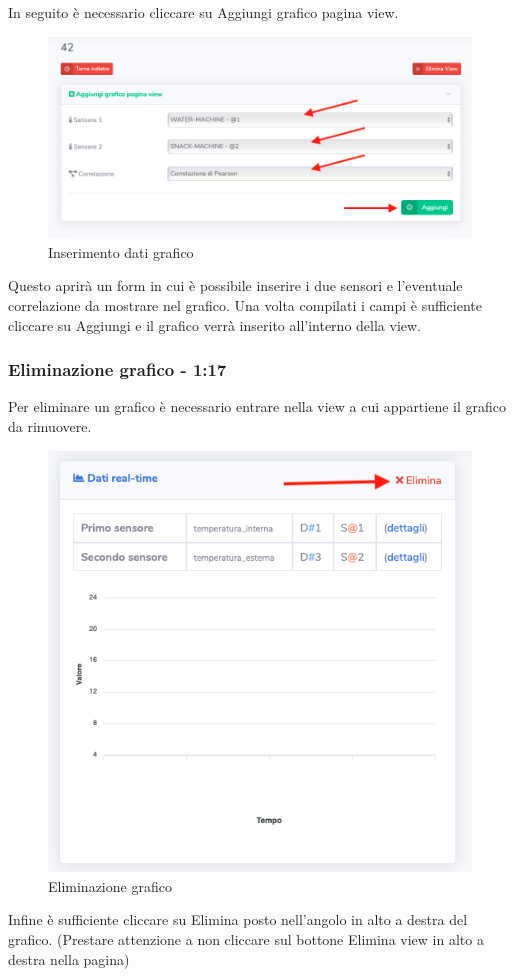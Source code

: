 		In seguito è necessario cliccare su Aggiungi grafico pagina view. 
		\begin{figure}[H]
		\centering
		\includegraphics[scale=0.600]{res/images/membro/insDatiGrafico.png}
		\caption{Inserimento dati grafico}
	\end{figure}
		Questo aprirà un form in cui è possibile inserire i due sensori e l'eventuale correlazione da mostrare nel grafico. Una volta compilati i campi è sufficiente cliccare su Aggiungi e il grafico verrà inserito all'interno della view.

	\subsubsection{Eliminazione grafico - 1:17}
		Per eliminare un grafico è necessario entrare nella view a cui appartiene il grafico da rimuovere. 
		\begin{figure}[H]
		\centering
		\includegraphics[scale=0.600]{res/images/membro/eliminazGrafico.png}
		\caption{Eliminazione grafico}
		\end{figure}
		Infine è sufficiente cliccare su Elimina posto nell'angolo in alto a destra del grafico. (Prestare attenzione a non cliccare sul bottone Elimina view in alto a destra nella pagina)

